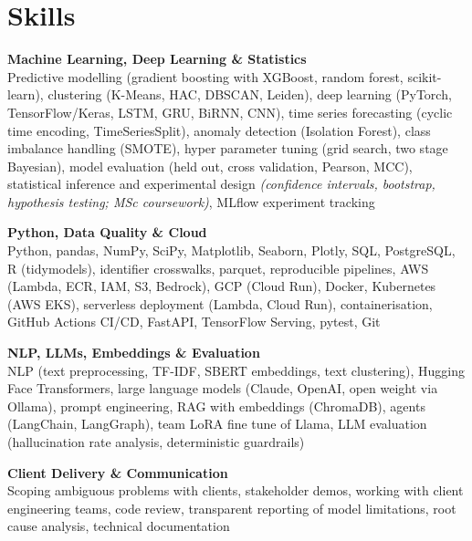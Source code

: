 \documentclass[a4paper,11pt]{article}
\newcommand{\skillgroup}[2]{{\color{navy}\textbf{#1}}\\ #2\par\vspace{3pt}}
\begin{document}
\section{Skills}
\skillgroup{Machine Learning, Deep Learning \& Statistics}{Predictive modelling (gradient boosting with XGBoost, random forest, scikit-learn), clustering (K-Means, HAC, DBSCAN, Leiden), deep learning (PyTorch, TensorFlow/Keras, LSTM, GRU, BiRNN, CNN), time series forecasting (cyclic time encoding, TimeSeriesSplit), anomaly detection (Isolation Forest), class imbalance handling (SMOTE), hyper parameter tuning (grid search, two stage Bayesian), model evaluation (held out, cross validation, Pearson, MCC), statistical inference and experimental design \textit{(confidence intervals, bootstrap, hypothesis testing; MSc coursework)}, MLflow experiment tracking}
\skillgroup{Python, Data Quality \& Cloud}{Python, pandas, NumPy, SciPy, Matplotlib, Seaborn, Plotly, SQL, PostgreSQL, R (tidymodels), identifier crosswalks, parquet, reproducible pipelines, AWS (Lambda, ECR, IAM, S3, Bedrock), GCP (Cloud Run), Docker, Kubernetes (AWS EKS), serverless deployment (Lambda, Cloud Run), containerisation, GitHub Actions CI/CD, FastAPI, TensorFlow Serving, pytest, Git}
\skillgroup{NLP, LLMs, Embeddings \& Evaluation}{NLP (text preprocessing, TF-IDF, SBERT embeddings, text clustering), Hugging Face Transformers, large language models (Claude, OpenAI, open weight via Ollama), prompt engineering, RAG with embeddings (ChromaDB), agents (LangChain, LangGraph), team LoRA fine tune of Llama, LLM evaluation (hallucination rate analysis, deterministic guardrails)}
\skillgroup{Client Delivery \& Communication}{Scoping ambiguous problems with clients, stakeholder demos, working with client engineering teams, code review, transparent reporting of model limitations, root cause analysis, technical documentation}
\end{document}
